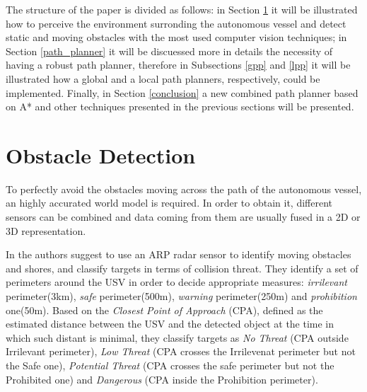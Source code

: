 \documentclass[journal]{IEEEtran}
\begin{document}
      \indent The structure of the paper is divided as follows: in Section \ref{obs_det} it will be illustrated how to perceive the environment surronding the autonomous vessel and detect static and moving obstacles with the most used computer vision techniques; in Section \ref{path_planner} it will be discuessed more in details the necessity of having a robust path planner, therefore in Subsections \ref{gpp} and \ref{lpp} it will be illustrated how a global and a local path planners, respectively, could be implemented. Finally, in Section \ref{conclusion} a new combined path planner based on A* and other techniques presented in the previous sections will be presented.


\section{Obstacle Detection} \label{obs_det}

      \indent To perfectly avoid the obstacles moving across the path of the autonomous vessel, an highly accurated world model is required. In order to obtain it, different sensors can be combined and data coming from them are usually fused in a 2D or 3D representation.

      \indent In \parencite{Almeida2009} the authors suggest to use an ARP radar sensor to identify moving obstacles and shores, and classify targets in terms of collision threat. They identify a set of perimeters around the USV in order to decide appropriate measures: \textit{irrilevant} perimeter(3km), \textit{safe} perimeter(500m), \textit{warning} perimeter(250m) and \textit{prohibition} one(50m). Based on the \textit{Closest Point of Approach} (CPA), defined as the estimated distance between the USV and the detected object at the time in which such distant is minimal, they classify targets as \textit{No Threat} (CPA outside Irrilevant perimeter), \textit{Low Threat} (CPA crosses the Irrilevenat perimeter but not the Safe one), \textit{Potential Threat} (CPA crosses the safe perimeter but not the Prohibited one) and \textit{Dangerous} (CPA inside the Prohibition perimeter).
\end{document}
